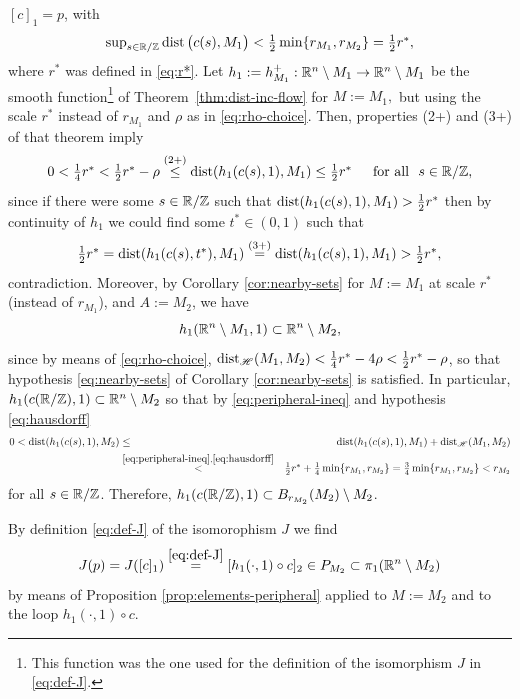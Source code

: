 $[c]_1=p$, with 
\begin{equation}\label{eq:close-loop}
\textstyle
\sup_{s\in\mathbb{R}/\mathbb{Z}}\operatorname{dist}\big(c(s),M_1\big)< \frac12 \min\{r_{M_1},r_{M_2}\}=\frac12 r^*,
\end{equation}
where $r^*$ was defined in \eqref{eq:r*}.
Let $h_1:=h_{M_1}^+:\mathbb{R}^n\setminus M_1\to\mathbb{R}^n\setminus M_1$
be the smooth function\footnote{This function was the one used for
the definition of the isomorphism $J$ in \eqref{eq:def-J}.}
of Theorem~\ref{thm:dist-inc-flow} for $M:=M_1,
$ but using the scale $r^*$   
instead of $r_{M_1}$ and $\rho$ as in \eqref{eq:rho-choice}.
Then, properties (2+) and (3+) of that theorem imply
\begin{equation}\label{eq:peripheral-ineq}
\textstyle
0<\frac14{r^*}<\frac12{r^*}-\rho\overset{\textnormal{(2+)}}{\le}\operatorname{dist}(h_1(c(s),1),M_1)\le
\frac12{r^*}\quad\,\,\,\text{for all }\,\, s\in \mathbb{R}/\mathbb{Z},
\end{equation}
since if there were some $s\in\mathbb{R}/\mathbb{Z}$ such that $\operatorname{dist} (h_1(c(s),1),M_1)>
\frac12{r^*}$ then by continuity of $h_1$ we could find some $t^*\in (0,1)$
such that 
$$
\textstyle
\frac12{r^*}=\operatorname{dist}(h_1(c(s),t^*),M_1)\overset{\textnormal{(3+)}}{=}
\operatorname{dist}(h_1(c(s),1),M_1)>\frac12{r^*},
$$
contradiction. Moreover, by Corollary \ref{cor:nearby-sets} for $M:=M_1$ at scale
$r^*$ (instead of $r_{M_1}$), and $A:=M_2$, we have
\begin{equation}\label{eq:respect-complements3}
h_1(\mathbb{R}^n\setminus M_1,1)\subset\mathbb{R}^n\setminus M_2,
\end{equation}
since by means of \eqref{eq:rho-choice},
$\operatorname{dist}_{\mathscr{H}}(M_1,M_2)<\frac14 r^*-4\rho<\frac12 r^*-\rho$,
so that hypothesis \eqref{eq:nearby-sets} of Corollary \ref{cor:nearby-sets}
is satisfied. In particular, $h_1(c(\mathbb{R}/\mathbb{Z}),1)\subset\mathbb{R}^n\setminus M_2$ so that
by \eqref{eq:peripheral-ineq} and hypothesis \eqref{eq:hausdorff}
\begin{eqnarray*}
0  < \operatorname{dist}(h_1(c(s),1),M_2) &\le &\operatorname{dist}(h_1(c(s),1),M_1)+\operatorname{dist}_{\mathscr{H}}(M_1,M_2)\\
&\overset{\eqref{eq:peripheral-ineq},\eqref{eq:hausdorff}}{<} &
\textstyle
\frac12{r^*}+\frac14 \min\{r_{M_1},r_{M_2}\}
=\frac34 \min\{r_{M_1},r_{M_2}\}< r_{M_2}
\end{eqnarray*}
for all $s\in\mathbb{R}/\mathbb{Z}$.
Therefore, $h_1(c(\mathbb{R}/\mathbb{Z}),1)\subset B_{r_{M_2}}(M_2)\setminus M_2$. 

By definition \eqref{eq:def-J} of the isomorophism $J$ we find
$$
J(p)=J([c]_1)\overset{\eqref{eq:def-J}}{=}[h_1(\cdot,1)\circ c]_2\in P_{M_2}
\subset\pi_1(\mathbb{R}^n\setminus M_2)
$$
by means of Proposition \ref{prop:elements-peripheral} applied to
$M:=M_2$ and to the loop $h_1(\cdot,1)\circ c$.

